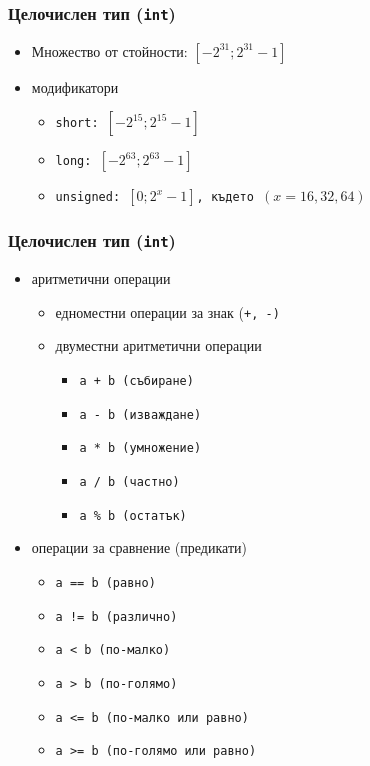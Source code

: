 \documentclass{beamer}
\begin{document}
\begin{frame}
  \frametitle{Целочислен тип (\texttt{int})}
  \begin{itemize}
  \item Множество от стойности: $[-2^{31}; 2^{31}-1]$
  \item модификатори
    \begin{itemize}
    \item \tt{short}:\hspace{2ex} $[-2^{15}; 2^{15}-1 ]$
    \item \tt{long}:\hspace{2ex} $[-2^{63}; 2^{63} - 1]$
    \item \tt{unsigned}:\hspace{2ex} $[0; 2^x-1 ]$, където $(x = 16, 32, 64)$
    \end{itemize}
  \end{itemize}
\end{frame}

\begin{frame}
  \frametitle{Целочислен тип (\texttt{int})}
  \begin{itemize}
  \item аритметични операции
    \begin{itemize}
    \item едноместни операции за знак (\tt+, \tt-)
    \item двуместни аритметични операции
      \begin{itemize}
      \item \tt{a + b} (събиране)
      \item \tt{a - b} (изваждане)
      \item \tt{a * b} (умножение)
      \item \tt{a / b} (частно)
      \item \tt{a \% b} (остатък)
      \end{itemize}
    \end{itemize}
  \item операции за сравнение (предикати)
    \begin{itemize}
    \item \tt{a == b} (равно)
    \item \tt{a != b} (различно)
    \item \tt{a < b} (по-малко)
    \item \tt{a > b} (по-голямо)
    \item \tt{a <= b} (по-малко или равно)
    \item \tt{a >= b} (по-голямо или равно)
    \end{itemize}
  \end{itemize}
\end{frame}
\end{document}
